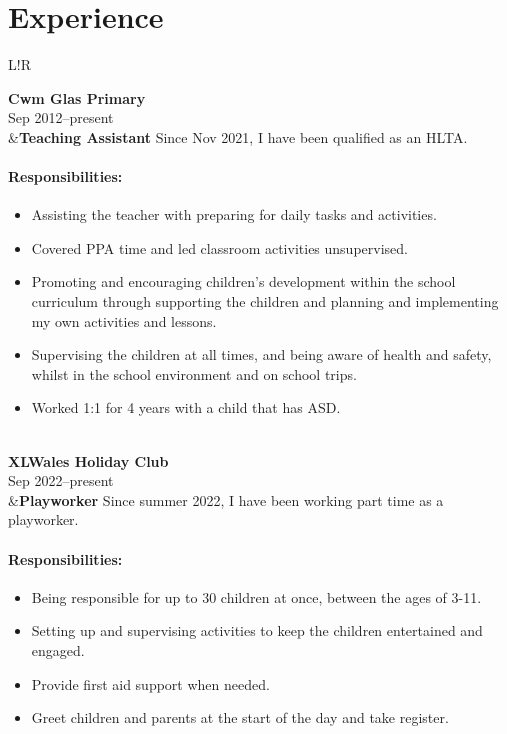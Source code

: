 \documentclass[10pt]{article}
\newcommand\VRule{\color{lightgray}\vrule width 0.5pt}
\begin{document}
\section*{Experience}
\begin{longtable}{L!{\VRule}R}

{\bf Cwm Glas Primary}\\
Sep 2012--present\\
&{\bf Teaching Assistant}\newline
Since Nov 2021, I have been qualified as an HLTA.

\vspace{-3mm}
\paragraph{Responsibilities:}
\begin{itemize}[noitemsep,topsep=0pt]
    \item Assisting the teacher with preparing for daily tasks and activities.
    \item Covered PPA time and led classroom activities unsupervised.
    \item Promoting and encouraging children's development within the school curriculum through supporting the children and planning and implementing my own activities and lessons.
    \item Supervising the children at all times, and being aware of health and safety, whilst in the school environment and on school trips.
    \item Worked 1:1 for 4 years with a child that has ASD.
\end{itemize}
\\

{\bf XLWales Holiday Club}\\
Sep 2022--present\\
&{\bf Playworker}\newline
Since summer 2022, I have been working part time as a playworker.

\vspace{-3mm}
\paragraph{Responsibilities:}
\begin{itemize}[noitemsep,topsep=0pt]
    \item Being responsible for up to 30 children at once, between the ages of 3-11.
	\item Setting up and supervising activities to keep the children entertained and engaged.
	\item Provide first aid support when needed.
	\item Greet children and parents at the start of the day and take register.
\end{itemize}
\\


\end{longtable}
\end{document}
